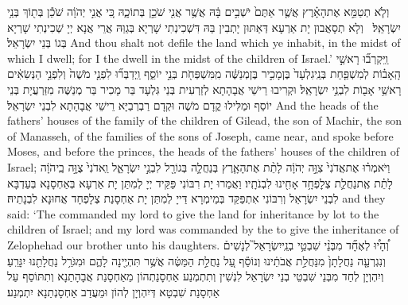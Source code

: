 {וְלֹ֧א תְטַמֵּ֣א אֶת\maqqaf הָאָ֗רֶץ אֲשֶׁ֤ר אַתֶּם֙ יֹשְׁבִ֣ים בָּ֔הּ אֲשֶׁ֥ר אֲנִ֖י שֹׁכֵ֣ן בְּתוֹכָ֑הּ כִּ֚י אֲנִ֣י יְהֹוָ֔ה שֹׁכֵ֕ן בְּת֖וֹךְ בְּנֵ֥י יִשְׂרָאֵֽל׃ \petucha }
{וְלָא תְסָאֲבוּן יָת אַרְעָא דְּאַתּוּן יָתְבִין בַּהּ דִּשְׁכִינְתִי שָׁרְיָא בְּגַוַּהּ אֲרֵי אֲנָא יְיָ שְׁכִינְתִי שָׁרְיָא בְּגוֹ בְּנֵי יִשְׂרָאֵל׃}
{And thou shalt not defile the land which ye inhabit, in the midst of which I dwell; for I the \lord\space dwell in the midst of the children of Israel.’}{}
\newperek
{}
{וַֽיִּקְרְב֞וּ רָאשֵׁ֣י הָֽאָב֗וֹת לְמִשְׁפַּ֤חַת בְּנֵֽי\maqqaf גִלְעָד֙ בֶּן\maqqaf מָכִ֣יר בֶּן\maqqaf מְנַשֶּׁ֔ה מִֽמִּשְׁפְּחֹ֖ת בְּנֵ֣י יוֹסֵ֑ף וַֽיְדַבְּר֞וּ לִפְנֵ֤י מֹשֶׁה֙ וְלִפְנֵ֣י הַנְּשִׂאִ֔ים רָאשֵׁ֥י אָב֖וֹת לִבְנֵ֥י יִשְׂרָאֵֽל׃}
{וּקְרִיבוּ רֵישֵׁי אֲבָהָתָא לְזַרְעִית בְּנֵי גִּלְעָד בַּר מָכִיר בַּר מְנַשֶּׁה מִזַּרְעֲיָת בְּנֵי יוֹסֵף וּמַלִּילוּ קֳדָם מֹשֶׁה וּקְדָם רַבְרְבַיָּא רֵישֵׁי אֲבָהָתָא לִבְנֵי יִשְׂרָאֵל׃}
{And the heads of the fathers’ houses of the family of the children of Gilead, the son of Machir, the son of Manasseh, of the families of the sons of Joseph, came near, and spoke before Moses, and before the princes, the heads of the fathers’ houses of the children of Israel;}{}
{וַיֹּאמְר֗וּ אֶת\maqqaf אֲדֹנִי֙ צִוָּ֣ה יְהֹוָ֔ה לָתֵ֨ת אֶת\maqqaf הָאָ֧רֶץ בְּנַחֲלָ֛ה בְּגוֹרָ֖ל לִבְנֵ֣י יִשְׂרָאֵ֑ל וַֽאדֹנִי֙ צֻוָּ֣ה בַֽיהֹוָ֔ה לָתֵ֗ת אֶֽת\maqqaf נַחֲלַ֛ת צְלׇפְחָ֥ד אָחִ֖ינוּ לִבְנֹתָֽיו׃}
{וַאֲמַרוּ יָת רִבּוֹנִי פַּקֵּיד יְיָ לְמִתַּן יָת אַרְעָא בְּאַחְסָנָא בְּעַדְבָּא לִבְנֵי יִשְׂרָאֵל וְרִבּוֹנִי אִתְפַּקַּד בְּמֵימְרָא דַּייָ לְמִתַּן יָת אַחְסָנַת צְלָפְחָד אֲחוּנָא לִבְנָתֵיהּ׃}
{and they said: ‘The \lord\space commanded my lord to give the land for inheritance by lot to the children of Israel; and my lord was commanded by the \lord\space to give the inheritance of Zelophehad our brother unto his daughters.}{}
{וְ֠הָי֠וּ לְאֶחָ֞ד מִבְּנֵ֨י שִׁבְטֵ֥י בְנֵֽי\maqqaf יִשְׂרָאֵל֮ לְנָשִׁים֒ וְנִגְרְעָ֤ה נַחֲלָתָן֙ מִנַּחֲלַ֣ת אֲבֹתֵ֔ינוּ וְנוֹסַ֕ף עַ֚ל נַחֲלַ֣ת הַמַּטֶּ֔ה אֲשֶׁ֥ר תִּהְיֶ֖ינָה לָהֶ֑ם וּמִגֹּרַ֥ל נַחֲלָתֵ֖נוּ יִגָּרֵֽעַ׃}
{וְיִהְוְיָן לְחַד מִבְּנֵי שִׁבְטֵי בְנֵי יִשְׂרָאֵל לִנְשִׁין וְתִתְמְנַע אַחְסָנַתְהוֹן מֵאַחְסָנַת אֲבָהָתַנָא וְתִתּוֹסַף עַל אַחְסָנַת שִׁבְטָא דְּיִהְוְיָן לְהוֹן וּמֵעֲדַב אַחְסָנְתַנָא יִתְמְנַע׃}
